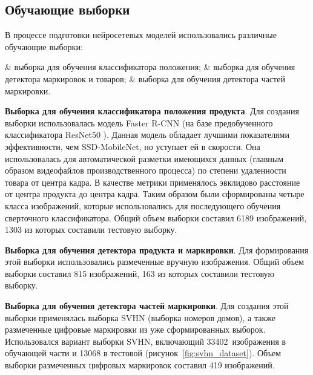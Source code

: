 \subsection{Обучающие выборки}

В процессе подготовки нейросетевых моделей использовались различные обучающие выборки:

\begin{easylist}
	& выборка для обучения классификатора положения;
	& выборка для обучения детектора маркировок и товаров;
	& выборка для обучения детектора частей маркировки.
\end{easylist} 

\textbf{Выборка для обучения классификатора положения продукта}. Для создания выборки использовалась модель Faster R-CNN \cite[c.~3]{ren} (на базе  предобученного классификатора ResNet50 \cite[c.~6]{he}). Данная модель обладает лучшими показателями эффективности, чем SSD-MobileNet, но уступает ей в скорости. Она использовалась для автоматической разметки имеющихся данных (главным образом видеофайлов производственного процесса) по степени удаленности товара от центра кадра. В качестве метрики применялось эвклидово расстояние от центра продукта до центра кадра. Таким образом были сформированы четыре класса изображений, которые использовались для последующего обучения сверточного классификатора. Общий объем выборки составил 6189 изображений, 1303 из которых составили тестовую выборку.

\textbf{Выборка для обучения детектора продукта и маркировки}. Для формирования этой выборки использовались размеченные вручную изображения. Общий объем выборки составил 815 изображений, 163 из которых составили тестовую выборку.


\textbf{Выборка для обучения детектора частей маркировки}. Для создания этой выборки применялась выборка SVHN \cite[c.~3]{netzer} (выборка номеров домов), а также размеченные цифровые маркировки из уже сформированных выборок. Использовался вариант выборки SVHN, включающий 33402~изображения в обучающей части и 13068 в тестовой (рисунок~\ref{fig:svhn_dataset}). Объем выборки размеченных цифровых маркировок составил 419 изображений.

